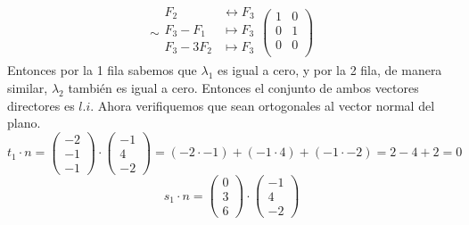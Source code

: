 \documentclass{article}
\begin{document}
\begin{enumerate}
\begin{itemize}
\begin{itemize}
\[                        \sim
                        \begin{aligned}
                            F_2 &\leftrightarrow F_3 \\
                            F_3 - F_1 &\mapsto F_3 \\
                            F_3 - 3F_2 &\mapsto F_3 \\
                        \end{aligned}
                        \begin{pmatrix}
                            1 & 0 \\
                            0 & 1 \\
                            0 & 0 \\
                        \end{pmatrix}
                    \]
                    Entonces por la 1 fila sabemos que \(\lambda_1\) es igual a cero, y por la 2 fila, de manera similar, \(\lambda_2\) también es igual a cero.
                    Entonces el conjunto de ambos vectores directores es \(l.i\). Ahora verifiquemos que sean ortogonales al vector normal del plano.
                    \[
                        t_1 \cdot n =
                        \begin{pmatrix}
                            -2 \\ -1 \\ -1
                        \end{pmatrix}
                        \cdot
                        \begin{pmatrix}
                            -1 \\ 4 \\ -2
                        \end{pmatrix}
                        =
                        (-2 \cdot -1) + (-1 \cdot 4) + (-1 \cdot -2)
                        =
                        2 - 4 + 2 
                        =
                        0
                    \]
                    \[
                        s_1 \cdot n =
                        \begin{pmatrix}
                            0 \\ 3 \\ 6
                        \end{pmatrix}
                        \cdot
                        \begin{pmatrix}
                            -1 \\ 4 \\ -2

\end{pmatrix}\]
\end{itemize}
\end{itemize}
\end{enumerate}
\end{document}
